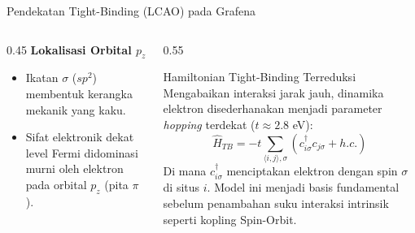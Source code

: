 \documentclass[13pt, aspectratio=169]{beamer}
\begin{document}
\begin{frame}{Pendekatan Tight-Binding (LCAO) pada Grafena}
    \begin{columns}[T]
        \begin{column}{0.45\textwidth}
            \textbf{Lokalisasi Orbital $p_z$}
            \vspace{0.2cm}
            \begin{itemize}
                \item Ikatan $\sigma$ ($sp^2$) membentuk kerangka mekanik yang kaku.
                \item Sifat elektronik dekat level Fermi didominasi murni oleh elektron pada orbital $p_z$ (pita $\pi$).
            \end{itemize}
        \end{column}
       \pause 
        \begin{column}{0.55\textwidth}
            \begin{block}{Hamiltonian Tight-Binding Terreduksi}
                Mengabaikan interaksi jarak jauh, dinamika elektron disederhanakan menjadi parameter \textit{hopping} terdekat ($t \approx 2.8$ eV):
                \begin{equation*}
                    \hat{H}_{TB} = -t \sum_{\langle i,j \rangle, \sigma} \left( c_{i\sigma}^\dagger c_{j\sigma} + h.c. \right)
                \end{equation*}
                \vspace{0.1cm}
                \footnotesize{Di mana $c_{i\sigma}^\dagger$ menciptakan elektron dengan spin $\sigma$ di situs $i$. Model ini menjadi basis fundamental sebelum penambahan suku interaksi intrinsik seperti kopling Spin-Orbit.}
            \end{block}
        \end{column}
    \end{columns}
\end{frame}
\end{document}
